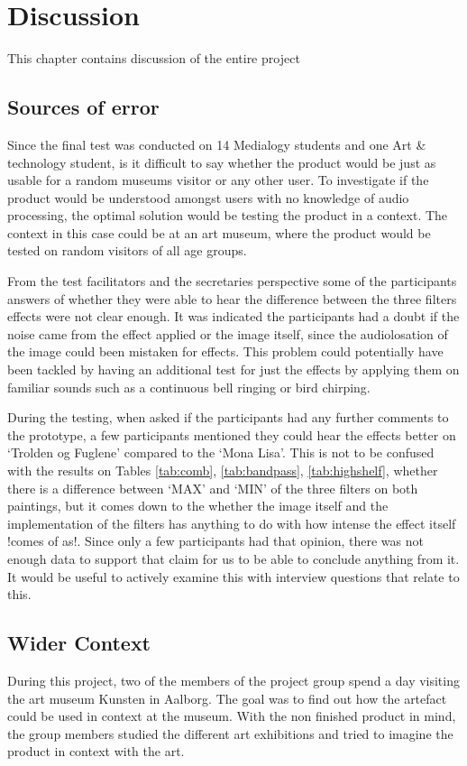 \chapter{Discussion}\label{ch:discussion}
This chapter contains discussion of the entire project

\section{Sources of error}
Since the final test was conducted on 14 Medialogy students and one Art \& technology student, is it difficult to say whether the product would be just as usable for a random museums visitor or any other user. To investigate if the product would be understood amongst users with no knowledge of audio processing, the optimal solution would be testing the product in a context. The context in this case could be at an art museum, where the product would be tested on random visitors of all age groups.

From the test facilitators and the secretaries perspective some of the participants answers of whether they were able to hear the difference between the three filters effects were not clear enough. It was indicated the participants had a doubt if the noise came from the effect applied or the image itself, since the audiolosation of the image could been mistaken for effects. This problem could potentially have been tackled by having an additional test for just the effects by applying them on familiar sounds such as a continuous bell ringing or bird chirping. 

During the testing, when asked if the participants had any further comments to the prototype, a few participants mentioned they could hear the effects better on ‘Trolden og Fuglene’ compared to the ‘Mona Lisa’. This is not to be confused with the results on Tables \ref{tab:comb}, \ref{tab:bandpass}, \ref{tab:highshelf}, whether there is a difference between ‘MAX’ and ‘MIN’ of the three filters on both paintings, but it comes down to the whether the image itself and the implementation of the filters has anything to do with how intense the effect itself !comes of as!. Since only a few participants had that opinion, there was not enough data to support that claim for us to be able to conclude anything from it. It would be useful to actively examine this with interview questions that relate to this.

\section{Wider Context}
During this project, two of the members of the project group spend a day visiting the art museum Kunsten in Aalborg. The goal was to find out how the artefact could be used in context at the museum. With the non finished product in mind, the group members studied the different art exhibitions and tried to imagine the product in context with the art.


